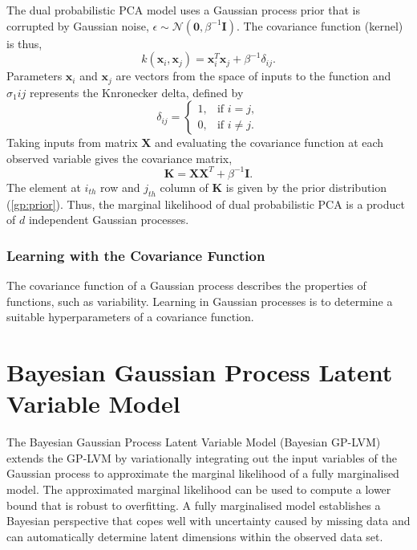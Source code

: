 \documentclass[ %
author={Dillon Keith Diep},
supervisor={Dr. Carl Henrik Ek},
degree={MEng},
title={ART-CG:},
subtitle={Assisted Real-time Content Generation of 3D Hair by Learning Manifolds},
type={Research},
year={2017} ]{dissertation}
\begin{document}
The dual probabilistic PCA model uses a Gaussian process prior that is corrupted by Gaussian noise\cite{gplvm}, $\epsilon\sim\mathcal{N}(\bm{0},\beta^{-1}\bm{I})$.
The covariance function (kernel) is thus,
\begin{equation} \label{gp:prior}
k(\bm{x}_i,\bm{x}_j)=\bm{x}^T_i\bm{x}_j+\beta^{-1}\delta_{ij}.
\end{equation}
Parameters $\bm{x}_i$ and $\bm{x}_j$ are vectors from the space of inputs to the function and $\sigma_1{ij}$ represents the Knronecker delta, defined by 
\begin{equation} \label{kronecker}
\delta_{ij} =
\begin{cases}
1, &         \text{if } i=j,\\
0, &         \text{if } i\neq j.
\end{cases}
\end{equation}
Taking inputs from matrix $\bm{X}$ and evaluating the covariance function at each observed variable gives the covariance matrix,
$$\bm{K=XX}^T+\beta^{-1}\bm{I}.$$
The element at $i_{th}$ row and $j_{th}$ column of $\bm{K}$ is given by the prior distribution (\ref{gp:prior}). Thus, the marginal likelihood of dual probabilistic PCA is a product of $d$ independent Gaussian processes.

\subsubsection{Learning with the Covariance Function}
The covariance function of a Gaussian process describes the properties of functions, such as variability. Learning in Gaussian processes is to determine a suitable hyperparameters of a covariance function.

\section{Bayesian Gaussian Process Latent Variable Model}
The Bayesian Gaussian Process Latent Variable Model (Bayesian GP-LVM) \cite{bgplvm} extends the GP-LVM by variationally integrating out the input variables of the Gaussian process to approximate the marginal likelihood of a fully marginalised model. The approximated marginal likelihood can be used to compute a lower bound that is robust to overfitting. A fully marginalised model establishes a Bayesian perspective that copes well with uncertainty caused by missing data and can automatically determine latent dimensions within the observed data set.
\end{document}

